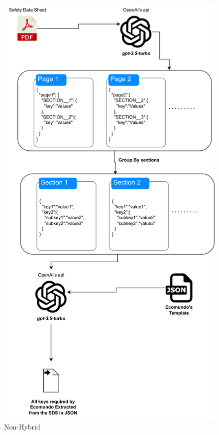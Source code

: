 \documentclass[a4paper,12pt,twoside]{report}
\begin{document}
\begin{figure}
		\includegraphics[width=\textwidth, height=\textheight/2, keepaspectratio ]{images/Non-Hybrid}
	\caption[How the Non-Hybrid code works]{Non-Hybrid}
\label{Non-Hybrid}
\end{figure}
\end{document}

